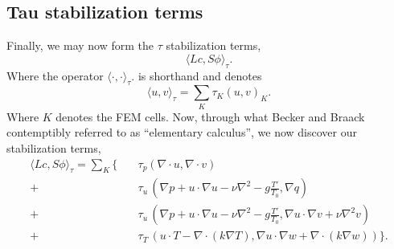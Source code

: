 %
%
\subsection{Tau stabilization terms}

Finally, we may now form the $\tau$ stabilization terms, 
\begin{equation}
 \langle Lc,S\phi \rangle_\tau. 
\end{equation}
Where the operator $ \langle \cdot,\cdot \rangle_\tau. $ is shorthand 
and denotes
\begin{equation}
 \langle u,v \rangle_\tau = \sum_K \tau_K (u,v)_K.
\end{equation}
Where $K$ denotes the FEM cells. Now, through what Becker and Braack
contemptibly referred to as ``elementary calculus'', we now discover our
stabilization terms,  
\begin{align*}
 \langle Lc,S\phi \rangle_\tau = \sum_K \{ \quad &\tau_p (\nabla \cdot u,
 \nabla \cdot v) \\
 +\quad &\tau_u \,(\nabla p + u \cdot \nabla u - \nu \nabla^2 - g \frac{T'}{T_0},
 \nabla q) \\
 +\quad &\tau_u \, (\nabla p + u \cdot \nabla u - \nu \nabla^2 - g \frac{T'}{T_0},
 \nabla u \cdot \nabla v + \nu \nabla^2 v) \\
 +\quad &\tau_T \, (u \cdot T - \nabla \cdot (k \nabla T), \nabla u \cdot \nabla
 w + \nabla \cdot (k \nabla w)) \}.
\end{align*}

